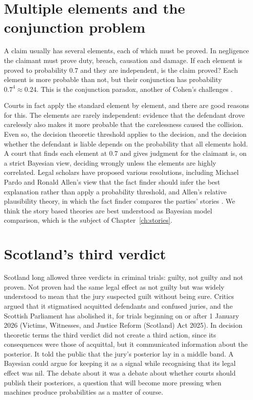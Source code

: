 \section{Multiple elements and the conjunction problem}

A claim usually has several elements, each of which must be proved. In negligence the claimant must prove duty, breach, causation and damage. If each element is proved to probability $0.7$ and they are independent, is the claim proved? Each element is more probable than not, but their conjunction has probability $0.7^4 \approx 0.24$. This is the conjunction paradox, another of Cohen's challenges \citep{cohen1977}.

Courts in fact apply the standard element by element, and there are good reasons for this. The elements are rarely independent: evidence that the defendant drove carelessly also makes it more probable that the carelessness caused the collision. Even so, the decision theoretic threshold applies to the decision, and the decision whether the defendant is liable depends on the probability that all elements hold. A court that finds each element at $0.7$ and gives judgment for the claimant is, on a strict Bayesian view, deciding wrongly unless the elements are highly correlated. Legal scholars have proposed various resolutions, including Michael Pardo and Ronald Allen's view that the fact finder should infer the best explanation rather than apply a probability threshold, and Allen's relative plausibility theory, in which the fact finder compares the parties' stories \citep{allen2019}. We think the story based theories are best understood as Bayesian model comparison, which is the subject of Chapter~\ref{ch:stories}.

\section{Scotland's third verdict}

Scotland long allowed three verdicts in criminal trials: guilty, not guilty and not proven. Not proven had the same legal effect as not guilty but was widely understood to mean that the jury suspected guilt without being sure. Critics argued that it stigmatised acquitted defendants and confused juries, and the Scottish Parliament has abolished it, for trials beginning on or after 1 January 2026 (Victims, Witnesses, and Justice Reform (Scotland) Act 2025). In decision theoretic terms the third verdict did not create a third action, since its consequences were those of acquittal, but it communicated information about the posterior. It told the public that the jury's posterior lay in a middle band. A Bayesian could argue for keeping it as a signal while recognising that its legal effect was nil. The debate about it was a debate about whether courts should publish their posteriors, a question that will become more pressing when machines produce probabilities as a matter of course.

